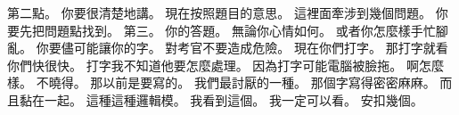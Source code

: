 \hypertarget{c01:cue:3644}{}第二點。
\hypertarget{c01:cue:3645}{}你要很清楚地講。
\hypertarget{c01:cue:3646}{}現在按照題目的意思。
\hypertarget{c01:cue:3647}{}這裡面牽涉到幾個問題。
\hypertarget{c01:cue:3648}{}你要先把問題點找到。
\hypertarget{c01:cue:3649}{}第三。
\hypertarget{c01:cue:3650}{}你的答題。
\hypertarget{c01:cue:3651}{}無論你心情如何。
\hypertarget{c01:cue:3652}{}或者你怎麼樣手忙腳亂。
\hypertarget{c01:cue:3653}{}你要儘可能讓你的字。
\hypertarget{c01:cue:3654}{}對考官不要造成危險。
\hypertarget{c01:cue:3655}{}現在你們打字。
\hypertarget{c01:cue:3656}{}那打字就看你們快很快。
\hypertarget{c01:cue:3657}{}打字我不知道他要怎麼處理。
\hypertarget{c01:cue:3658}{}因為打字可能電腦被臉拖。
\hypertarget{c01:cue:3659}{}啊怎麼樣。
\hypertarget{c01:cue:3660}{}不曉得。
\hypertarget{c01:cue:3661}{}那以前是要寫的。
\hypertarget{c01:cue:3662}{}我們最討厭的一種。
\hypertarget{c01:cue:3663}{}那個字寫得密密麻麻。
\hypertarget{c01:cue:3664}{}而且黏在一起。
\hypertarget{c01:cue:3665}{}這種這種邏輯模。
\hypertarget{c01:cue:3666}{}我看到這個。
\hypertarget{c01:cue:3667}{}我一定可以看。
\hypertarget{c01:cue:3668}{}安扣幾個。

